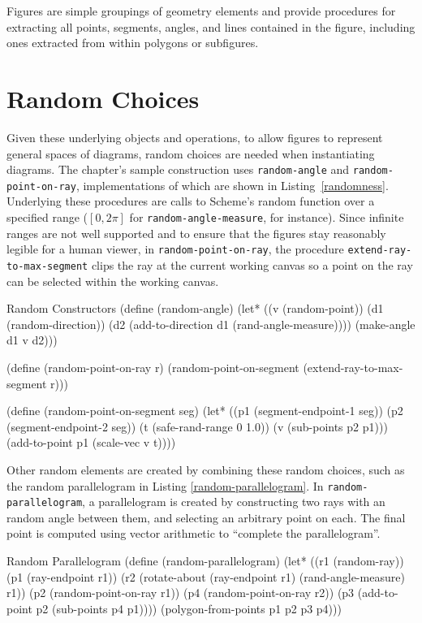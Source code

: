 Figures are simple groupings of geometry elements and provide
procedures for extracting all points, segments, angles,
and lines contained in the figure, including ones extracted from within
polygons or subfigures.

\section{Random Choices}

Given these underlying objects and operations, to allow figures to
represent general spaces of diagrams, random choices are needed when
instantiating diagrams. The chapter's sample construction uses
\texttt{random-angle} and \texttt{random-point-on-ray},
implementations of which are shown in Listing~\ref{randomness}.
Underlying these procedures are calls to Scheme's random function over
a specified range ($[0, 2\pi]$ for \texttt{random-angle-measure}, for
instance). Since infinite ranges are not well supported and to ensure
that the figures stay reasonably legible for a human viewer, in
\texttt{random-point-on-ray}, the procedure
\texttt{extend-ray-to-max-segment} clips the ray at the current
working canvas so a point on the ray can be selected within the
working canvas.

\enlargethispage*{0.5\baselineskip}

\begin{code-listing}
[label=randomness]
{Random Constructors}
(define (random-angle)
  (let* ((v (random-point))
         (d1 (random-direction))
         (d2 (add-to-direction d1 (rand-angle-measure))))
    (make-angle d1 v d2)))

(define (random-point-on-ray r)
  (random-point-on-segment
   (extend-ray-to-max-segment r)))

(define (random-point-on-segment seg)
  (let* ((p1 (segment-endpoint-1 seg))
         (p2 (segment-endpoint-2 seg))
         (t (safe-rand-range 0 1.0))
         (v (sub-points p2 p1)))
    (add-to-point p1 (scale-vec v t))))
\end{code-listing}
Other random elements are created by combining these random choices,
such as the random parallelogram in Listing
\ref{random-parallelogram}.  In \texttt{random-parallelogram}, a
parallelogram is created by constructing two rays with an random angle
between them, and selecting an arbitrary point on each. The final
point is computed using vector arithmetic to ``complete the
parallelogram''.

\begin{code-listing}
[label=random-parallelogram]
{Random Parallelogram}
(define (random-parallelogram)
  (let* ((r1 (random-ray))
         (p1 (ray-endpoint r1))
         (r2 (rotate-about (ray-endpoint r1) (rand-angle-measure) r1))
         (p2 (random-point-on-ray r1))
         (p4 (random-point-on-ray r2))
         (p3 (add-to-point p2 (sub-points p4 p1))))
    (polygon-from-points p1 p2 p3 p4)))
\end{code-listing}

